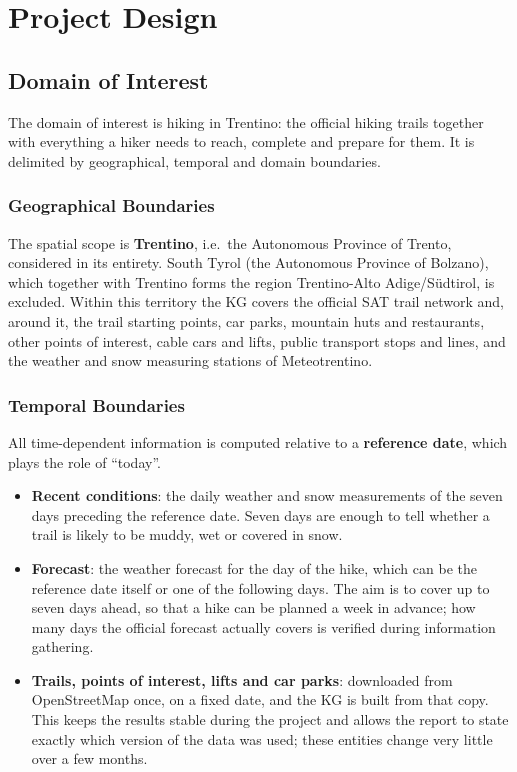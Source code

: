\section{Project Design}

\subsection{Domain of Interest}
\label{sec:domain}
The domain of interest is hiking in Trentino: the official hiking trails together with everything a hiker needs to reach, complete and prepare for them. It is delimited by geographical, temporal and domain boundaries.

\subsubsection{Geographical Boundaries}
The spatial scope is \textbf{Trentino}, i.e.\ the Autonomous Province of Trento, considered in its entirety. South Tyrol (the Autonomous Province of Bolzano), which together with Trentino forms the region Trentino-Alto Adige/Südtirol, is excluded. Within this territory the KG covers the official SAT trail network and, around it, the trail starting points, car parks, mountain huts and restaurants, other points of interest, cable cars and lifts, public transport stops and lines, and the weather and snow measuring stations of Meteotrentino.

\subsubsection{Temporal Boundaries}
All time-dependent information is computed relative to a \textbf{reference date}, which plays the role of ``today''.
\begin{itemize}
    \item \textbf{Recent conditions}: the daily weather and snow measurements of the seven days preceding the reference date. Seven days are enough to tell whether a trail is likely to be muddy, wet or covered in snow.
    \item \textbf{Forecast}: the weather forecast for the day of the hike, which can be the reference date itself or one of the following days. The aim is to cover up to seven days ahead, so that a hike can be planned a week in advance; how many days the official forecast actually covers is verified during information gathering.
    \item \textbf{Trails, points of interest, lifts and car parks}: downloaded from OpenStreetMap once, on a fixed date, and the KG is built from that copy. This keeps the results stable during the project and allows the report to state exactly which version of the data was used; these entities change very little over a few months.
\end{itemize}


